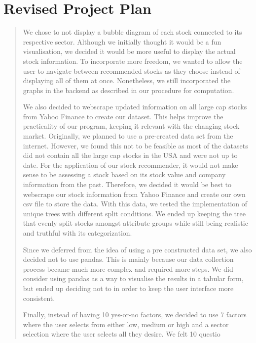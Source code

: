 \documentclass[fontsize=12pt]{article}
\begin{document}
\section*{Revised Project Plan}
\begin{quote}
\noindent We chose to not display a bubble diagram of each stock connected to its respective sector. Although we initially thought it would be a fun visualisation, we decided it would be more useful to display the actual stock information. To incorporate more freedom, we wanted to allow the user to navigate between recommended stocks as they choose instead of displaying all of them at once. Nonetheless, we still incorporated the graphs in the backend as described in our procedure for computation.  

We also decided to webscrape updated information on all large cap stocks from Yahoo Finance to create our dataset. This helps improve the practicality of our program, keeping it relevant with the changing stock market. Originally, we planned to use a pre-created data set from the internet. However, we found this not to be feasible as most of the datasets did not contain all the large cap stocks in the USA and were not up to date. For the application of our stock recommender, it would not make sense to be assessing a stock based on its stock value and company information from the past. Therefore, we decided it would be best to webscrape our stock information from Yahoo Finance and create our own csv file to store the data. With this data, we tested the implementation of unique trees with different split conditions. We ended up keeping the tree that evenly split stocks amongst attribute groups while still being realistic and truthful with its categorization.  

Since we deferred from the idea of using a pre constructed data set, we also decided not to use pandas. This is mainly because our data collection process became much more complex and required more steps. We did consider using pandas as a way to visualise the results in a tabular form, but ended up deciding not to in order to keep the user interface more consistent.  

Finally, instead of having 10 yes-or-no factors, we decided to use 7 factors where the user selects from either low, medium or high and a sector selection where the user selects all they desire. We felt 10 questio
\end{quote}
\end{document}
